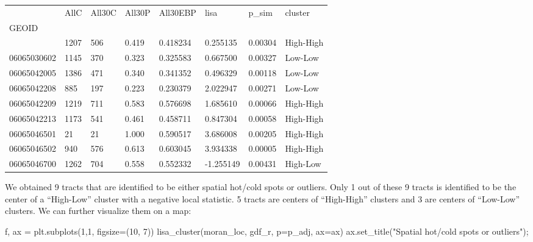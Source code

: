 \documentclass[
]{aft}
\newenvironment{Shaded}{\begin{snugshade}}{\end{snugshade}}
\newcommand{\DecValTok}[1]{\textcolor[rgb]{0.68,0.00,0.00}{#1}}
\newcommand{\NormalTok}[1]{\textcolor[rgb]{0.00,0.23,0.31}{#1}}
\newcommand{\OperatorTok}[1]{\textcolor[rgb]{0.37,0.37,0.37}{#1}}
\newcommand{\StringTok}[1]{\textcolor[rgb]{0.13,0.47,0.30}{#1}}
\begin{document}
\begin{longtable}[]{@{}llllllll@{}}
\toprule\noalign{}
& AllC & All30C & All30P & All30EBP & lisa & p\_sim & cluster \\
GEOID & & & & & & & \\
\midrule\noalign{}
\endhead
\bottomrule\noalign{}
\endlastfoot
06065030501 & 1207 & 506 & 0.419 & 0.418234 & 0.255135 & 0.00304 &
High-High \\
06065030602 & 1145 & 370 & 0.323 & 0.325583 & 0.667500 & 0.00327 &
Low-Low \\
06065042005 & 1386 & 471 & 0.340 & 0.341352 & 0.496329 & 0.00118 &
Low-Low \\
06065042208 & 885 & 197 & 0.223 & 0.230379 & 2.022947 & 0.00271 &
Low-Low \\
06065042209 & 1219 & 711 & 0.583 & 0.576698 & 1.685610 & 0.00066 &
High-High \\
06065042213 & 1173 & 541 & 0.461 & 0.458711 & 0.847304 & 0.00058 &
High-High \\
06065046501 & 21 & 21 & 1.000 & 0.590517 & 3.686008 & 0.00205 &
High-High \\
06065046502 & 940 & 576 & 0.613 & 0.603045 & 3.934338 & 0.00005 &
High-High \\
06065046700 & 1262 & 704 & 0.558 & 0.552332 & -1.255149 & 0.00431 &
High-Low \\
\end{longtable}

We obtained 9 tracts that are identified to be either spatial hot/cold
spots or outliers. Only 1 out of these 9 tracts is identified to be the
center of a ``High-Low'' cluster with a negative local statistic. 5
tracts are centers of ``High-High'' clusters and 3 are centers of
``Low-Low'' clusters. We can further visualize them on a map:

\begin{Shaded}
\begin{Highlighting}[]
\NormalTok{f, ax }\OperatorTok{=}\NormalTok{ plt.subplots(}\DecValTok{1}\NormalTok{,}\DecValTok{1}\NormalTok{, figsize}\OperatorTok{=}\NormalTok{(}\DecValTok{10}\NormalTok{, }\DecValTok{7}\NormalTok{))}
\NormalTok{lisa\_cluster(moran\_loc, gdf\_r, p}\OperatorTok{=}\NormalTok{p\_adj, ax}\OperatorTok{=}\NormalTok{ax)}
\NormalTok{ax.set\_title(}\StringTok{"Spatial hot/cold spots or outliers"}\NormalTok{)}\OperatorTok{;}
\end{Highlighting}
\end{Shaded}
\end{document}
